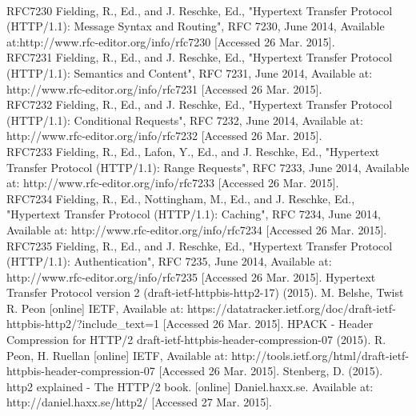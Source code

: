 \documentclass{article}
\begin{document}
\newpage

\newpage










\begin{thebibliography}
\\
RFC7230 Fielding, R., Ed., and J. Reschke, Ed., "Hypertext Transfer Protocol (HTTP/1.1): Message Syntax and Routing", RFC 7230, June 2014, Available at:http://www.rfc-editor.org/info/rfc7230  [Accessed 26 Mar. 2015]. \\
RFC7231 Fielding, R., Ed., and J. Reschke, Ed., "Hypertext Transfer Protocol (HTTP/1.1): Semantics and Content", RFC 7231, June 2014, Available at: http://www.rfc-editor.org/info/rfc7231 [Accessed 26 Mar. 2015]. \\
RFC7232 Fielding, R., Ed., and J. Reschke, Ed., "Hypertext Transfer Protocol (HTTP/1.1): Conditional Requests", RFC 7232, June 2014, Available at: http://www.rfc-editor.org/info/rfc7232 [Accessed 26 Mar. 2015]. \\ 
RFC7233 Fielding, R., Ed., Lafon, Y., Ed., and J. Reschke, Ed., "Hypertext Transfer Protocol (HTTP/1.1): Range Requests", RFC 7233, June 2014, Available at: http://www.rfc-editor.org/info/rfc7233 [Accessed 26 Mar. 2015]. \\
RFC7234 Fielding, R., Ed., Nottingham, M., Ed., and J. Reschke, Ed., "Hypertext Transfer Protocol (HTTP/1.1): Caching", RFC 7234, June 2014, Available at: http://www.rfc-editor.org/info/rfc7234 [Accessed 26 Mar. 2015]. \\
RFC7235 Fielding, R., Ed., and J. Reschke, Ed., "Hypertext Transfer Protocol (HTTP/1.1): Authentication", RFC 7235, June 2014, Available at: http://www.rfc-editor.org/info/rfc7235 [Accessed 26 Mar. 2015].
Hypertext Transfer Protocol version 2 (draft-ietf-httpbis-http2-17) (2015). M. Belshe, Twist R. Peon [online] IETF, Available at:
https://datatracker.ietf.org/doc/draft-ietf-httpbis-http2/?include\_text=1 [Accessed 26 Mar. 2015].
HPACK - Header Compression for HTTP/2 draft-ietf-httpbis-header-compression-07 (2015). R. Peon,  H. Ruellan [online] IETF, Available at: http://tools.ietf.org/html/draft-ietf-httpbis-header-compression-07 [Accessed 26 Mar. 2015].
Stenberg, D. (2015). http2 explained - The HTTP/2 book. [online] Daniel.haxx.se. Available at: http://daniel.haxx.se/http2/ [Accessed 27 Mar. 2015].

\end{thebibliography}
\end{document}
